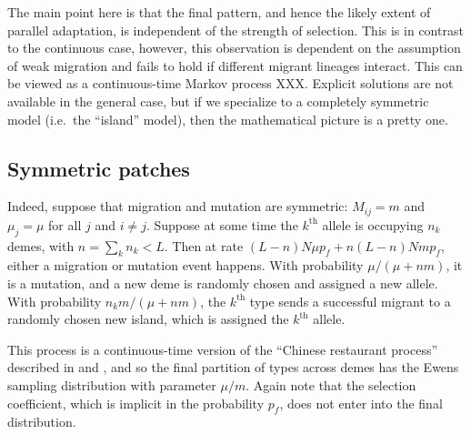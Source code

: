 \documentclass{article}
\begin{document}
The main point here is that the final pattern,
and hence the likely extent of parallel adaptation,
is independent of the strength of selection.
This is in contrast to the continuous case, however, this observation is dependent on the assumption of weak migration
and fails to hold if different migrant lineages interact.
This can be viewed as a continuous-time Markov process XXX.
Explicit solutions are not available in the general case,
but if we specialize to a completely symmetric model (i.e.\ the ``island'' model),
then the mathematical picture is a pretty one.

\subsection{Symmetric patches}

Indeed, suppose that migration and mutation are symmetric: $M_{ij}=m$ and $\mu_j = \mu$ for all $j$ and $i\neq j$.
Suppose at some time the $k^\mathrm{th}$ allele is occupying $n_k$ demes, 
with $n = \sum_k n_k < L$.
Then at rate $(L-n) N \mu p_f + n (L-n) N m p_f$,
either a migration or mutation event happens.
With probability $\mu/(\mu + n m)$, it is a mutation,
and a new deme is randomly chosen and assigned a new allele.
With probability $n_k m / (\mu + n m)$,
the $k^\mathrm{th}$ type sends a successful migrant to a randomly chosen new island,
which is assigned the $k^\mathrm{th}$ allele.

This process is a continuous-time version of the ``Chinese restaurant process''
described in \citet{aldous1985exchangeability} and \citet{pitman1995partitions},
and so the final partition of types across demes has the Ewens sampling distribution with parameter $\mu/m$.
Again note that the selection coefficient, which is implicit in the probability $p_f$,
does not enter into the final distribution.
\end{document}
